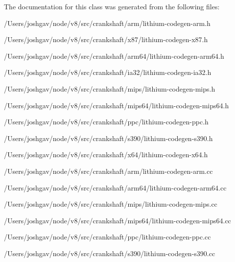 The documentation for this class was generated from the following files\+:\begin{DoxyCompactItemize}
\item 
/\+Users/joshgav/node/v8/src/crankshaft/arm/lithium-\/codegen-\/arm.\+h\item 
/\+Users/joshgav/node/v8/src/crankshaft/x87/lithium-\/codegen-\/x87.\+h\item 
/\+Users/joshgav/node/v8/src/crankshaft/arm64/lithium-\/codegen-\/arm64.\+h\item 
/\+Users/joshgav/node/v8/src/crankshaft/ia32/lithium-\/codegen-\/ia32.\+h\item 
/\+Users/joshgav/node/v8/src/crankshaft/mips/lithium-\/codegen-\/mips.\+h\item 
/\+Users/joshgav/node/v8/src/crankshaft/mips64/lithium-\/codegen-\/mips64.\+h\item 
/\+Users/joshgav/node/v8/src/crankshaft/ppc/lithium-\/codegen-\/ppc.\+h\item 
/\+Users/joshgav/node/v8/src/crankshaft/s390/lithium-\/codegen-\/s390.\+h\item 
/\+Users/joshgav/node/v8/src/crankshaft/x64/lithium-\/codegen-\/x64.\+h\item 
/\+Users/joshgav/node/v8/src/crankshaft/arm/lithium-\/codegen-\/arm.\+cc\item 
/\+Users/joshgav/node/v8/src/crankshaft/arm64/lithium-\/codegen-\/arm64.\+cc\item 
/\+Users/joshgav/node/v8/src/crankshaft/mips/lithium-\/codegen-\/mips.\+cc\item 
/\+Users/joshgav/node/v8/src/crankshaft/mips64/lithium-\/codegen-\/mips64.\+cc\item 
/\+Users/joshgav/node/v8/src/crankshaft/ppc/lithium-\/codegen-\/ppc.\+cc\item 
/\+Users/joshgav/node/v8/src/crankshaft/s390/lithium-\/codegen-\/s390.\+cc\end{DoxyCompactItemize}

